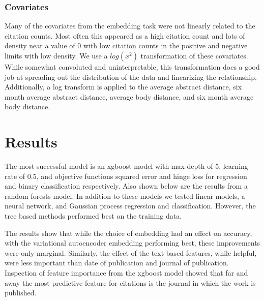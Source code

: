 \documentclass{article} %
\begin{document}
\subsubsection{Covariates}
Many of the covariates from the embedding task were not linearly related to the citation counts. Most often this appeared as a high citation count and lots of density near a value of 0 with low citation counts in the positive and negative limits with low density. We use a $log(x^2)$ transformation of these covariates. While somewhat convoluted and uninterpretable, this transformation does a good job at spreading out the distribution of the data and linearizing the relationship. Additionally, a log transform is applied to the average abstract distance, six month average abstract distance, average body distance, and six month average body distance.


\section{Results}
\label{others}

The most successful model is an xgboost model with max depth of 5, learning rate of 0.5, and objective functions squared error and hinge loss for regression and binary classification respectively. Also shown below are the results from a random forests model. In addition to these models we tested linear models, a neural network, and Gaussian process regression and classification. However, the tree based methods performed best on the training data.

The results show that while the choice of embedding had an effect on accuracy, with the variational autoencoder embedding performing best, these improvements were only marginal. Similarly, the effect of the text based features, while helpful,  were less important than date of publication and journal of publication. Inspection of feature importance from the xgboost model showed that far and away the most predictive feature for citations is the journal in which the work is published.
\end{document}
